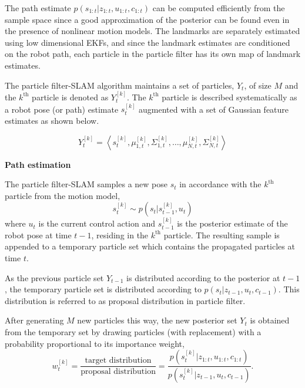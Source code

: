 The path estimate $p(s_{1:t}|z_{1:t},u_{1:t},c_{1:t})$ can be computed efficiently from the sample space since a good approximation of the posterior can be found even in the presence of nonlinear motion models. The landmarks are separately estimated using low dimensional EKFs, and since the landmark estimates are conditioned on the robot path, each particle in the particle filter has its own map of landmark estimates.

The particle filter-SLAM algorithm maintains a set of particles, $Y_t$, of size $M$ and the $k^{\text{th}}$ particle is denoted as $Y_t^{[k]}$. The $k^{\text{th}}$ particle is described systematically as a robot pose (or path) estimate $s^{[k]}_t$ augmented with a set of Gaussian feature estimates as shown below. 

\begin{equation}
Y_t^{[k]}=\left\langle s_t^{[k]}, \mu_{1,t}^{[k]}, \Sigma_{1,t}^{[k]}, \dots, \mu_{N,t}^{[k]}, \Sigma_{N,t}^{[k]} \right\rangle
\label{psf}
\end{equation}  

\textbf{Path estimation}

The particle filter-SLAM samples a new pose $s_t$ in accordance with the $k^{\text{th}}$ particle from the motion model,
\begin{equation}
s_t^{[k]}\sim p(s_t|s_{t-1}^{[k]},u_t)
\end{equation}
where $u_t$ is the current control action and $s_{t-1}^{[k]}$ is the posterior estimate of the robot pose at time $t-1$, residing in the $k^{\text{th}}$ particle. The resulting sample is appended to a temporary particle set which contains the propagated particles at time $t$.

As the previous particle set $Y_{t-1}$ is distributed according to the posterior at $t-1$, the temporary particle set is distributed according to $p(s_t|z_{t-1},u_t,c_{t-1})$. This distribution is referred to as proposal distribution in particle filter. 

After generating $M$ new particles this way, the new posterior set $Y_t$ is obtained from the temporary set by drawing particles (with replacement) with a probability proportional to its importance weight,
\begin{equation}
w_t^{[k]}=\frac{\text{target distribution}}{\text{proposal distribution}}=\frac{p(s_t^{[k]}|z_{1:t},u_{1:t},c_{1:t})}{p(s_t^{[k]}|z_{t-1},u_t,c_{t-1})}.
\label{imp_wt}
\end{equation}     
 
